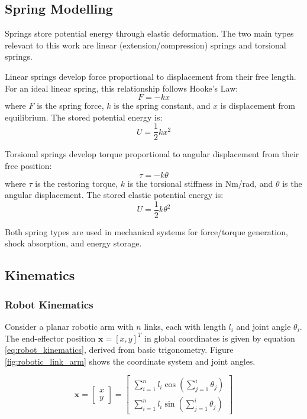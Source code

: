 \subsection{Spring Modelling}
\label{sec:spring_theory}
Springs store potential energy through elastic deformation. The two main types relevant to this work are linear (extension/compression) springs and torsional springs.

Linear springs develop force proportional to displacement from their free length. For an ideal linear spring, this relationship follows Hooke's Law:
\begin{equation}
    F = -kx
\end{equation}
where $F$ is the spring force, $k$ is the spring constant, and $x$ is displacement from equilibrium. The stored potential energy is:
\begin{equation}
    U = \frac{1}{2}kx^2
\end{equation}

Torsional springs develop torque proportional to angular displacement from their free position:
\begin{equation}
    \tau = -k\theta
\end{equation}
where $\tau$ is the restoring torque, $k$ is the torsional stiffness in Nm/rad, and $\theta$ is the angular displacement. The stored elastic potential energy is:
\begin{equation}
    U = \frac{1}{2}k\theta^2
\end{equation}

Both spring types are used in mechanical systems for force/torque generation, shock absorption, and energy storage.

\subsection{Kinematics}
    \subsubsection{Robot Kinematics}
    \label{sec:robot_kinematics}
Consider a planar robotic arm with $n$ links, each with length $l_i$ and joint angle $\theta_i$. The end-effector position $\bm{x} = [x, y]^T$ in global coordinates is given by equation \ref{eq:robot_kinematics}, derived from basic trigonometry. Figure \ref{fig:robotic_link_arm} shows the coordinate system and joint angles.

\begin{equation}
    \label{eq:robot_kinematics}
    \bm{x} = \begin{bmatrix}
        x \\
        y
    \end{bmatrix} = \begin{bmatrix}
        \sum_{i=1}^{n} l_i \cos\left(\sum_{j=1}^{i} \theta_j\right) \\
        \sum_{i=1}^{n} l_i \sin\left(\sum_{j=1}^{i} \theta_j\right)
    \end{bmatrix}
\end{equation}

